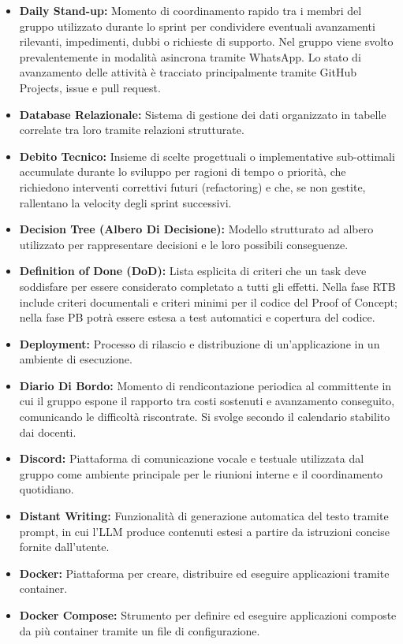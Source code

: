 \begin{itemize}[leftmargin=*]
      \item \textbf{Daily Stand-up:}
      Momento di coordinamento rapido tra i membri del gruppo utilizzato durante
      lo sprint per condividere eventuali avanzamenti rilevanti, impedimenti,
      dubbi o richieste di supporto. Nel gruppo viene svolto prevalentemente in
      modalità asincrona tramite WhatsApp. Lo stato di avanzamento delle attività
      è tracciato principalmente tramite GitHub Projects, issue e pull request.
      \item \textbf{Database Relazionale:} Sistema di gestione dei dati organizzato in tabelle correlate tra loro tramite relazioni strutturate.
      \item \textbf{Debito Tecnico:} Insieme di scelte progettuali o implementative
      sub-ottimali accumulate durante lo sviluppo per ragioni di tempo o priorità,
      che richiedono interventi correttivi futuri (refactoring) e che, se non gestite,
      rallentano la velocity degli sprint successivi.
      \item \textbf{Decision Tree (Albero Di Decisione):} Modello strutturato ad albero utilizzato per rappresentare decisioni e le loro possibili conseguenze.
      \item \textbf{Definition of Done (DoD):} Lista esplicita di criteri che un task
      deve soddisfare per essere considerato completato a tutti gli effetti. Nella fase
      RTB include criteri documentali e criteri minimi per il codice del Proof of
      Concept; nella fase PB potrà essere estesa a test automatici e copertura del
      codice.
      \item \textbf{Deployment:} Processo di rilascio e distribuzione di un’applicazione in un ambiente di esecuzione.
      \item \textbf{Diario Di Bordo:} Momento di rendicontazione periodica al committente
      in cui il gruppo espone il rapporto tra costi sostenuti e avanzamento
      conseguito, comunicando le difficoltà riscontrate. Si svolge secondo il
      calendario stabilito dai docenti.
      \item \textbf{Discord:} Piattaforma di comunicazione vocale e testuale utilizzata
            dal gruppo come ambiente principale per le riunioni interne e il coordinamento
            quotidiano.
      \item \textbf{Distant Writing:} Funzionalità di generazione automatica del testo tramite prompt, in cui l’LLM produce contenuti estesi a partire da istruzioni concise fornite dall’utente.
      \item \textbf{Docker:} Piattaforma per creare, distribuire ed eseguire applicazioni
      tramite container.
      \item \textbf{Docker Compose:} Strumento per definire ed eseguire applicazioni
      composte da più container tramite un file di configurazione.
\end{itemize}
 
